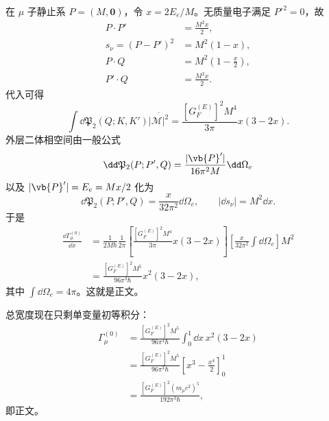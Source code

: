 \begin{derivation}[缪子衰变的自旋求和与三体相空间]
在 $\mu$ 子静止系 $P=(M,\mathbf0)$，令
$x=2E_e/M$。无质量电子满足 $P'^2=0$，故
\begin{align*}
P\!\cdot P'&=\frac{M^2x}{2},\\
s_\nu=(P-P')^2&=M^2(1-x),\\
P\!\cdot Q&=M^2\left(1-\frac{x}{2}\right),\\
P'\!\cdot Q&=\frac{M^2x}{2}.
\end{align*}
代入可得
\begin{equation*}
\int\dd\mathfrak P_2(Q;K,K')\overline{|\mathcal M|^2}
=\frac{[G_F^{(E)}]^2M^4}{3\pi}x(3-2x).
\end{equation*}
外层二体相空间由一般公式
\begin{equation*}
\dd\mathfrak P_2(P;P',Q)
=\frac{|\vb{P}'|}{16\pi^2M}\dd\Omega_e
\end{equation*}
以及 $|\vb{P}'|=E_e=Mx/2$ 化为
\begin{equation*}
\dd\mathfrak P_2(P;P',Q)
=\frac{x}{32\pi^2}\dd\Omega_e,
\qquad
|\dd s_\nu|=M^2\dd x.
\end{equation*}
于是
\begin{align*}
\frac{\dd\Gamma_\mu^{(0)}}{\dd x}
&=\frac{1}{2M\hbar}\frac1{2\pi}
\left[\frac{[G_F^{(E)}]^2M^4}{3\pi}x(3-2x)\right]
\left[\frac{x}{32\pi^2}\int\dd\Omega_e\right]M^2\\
&=\frac{[G_F^{(E)}]^2M^5}{96\pi^3\hbar}
 x^2(3-2x),
\end{align*}
其中 $\int\dd\Omega_e=4\pi$。这就是正文。

总宽度现在只剩单变量初等积分：
\begin{align*}
\Gamma_\mu^{(0)}
&=\frac{[G_F^{(E)}]^2M^5}{96\pi^3\hbar}
\int_0^1\dd x\,x^2(3-2x)\\
&=\frac{[G_F^{(E)}]^2M^5}{96\pi^3\hbar}
\left[x^3-\frac{x^4}{2}\right]_0^1\\
&=\frac{[G_F^{(E)}]^2(m_\mu c^2)^5}{192\pi^3\hbar},
\end{align*}
即正文。
\end{derivation}

